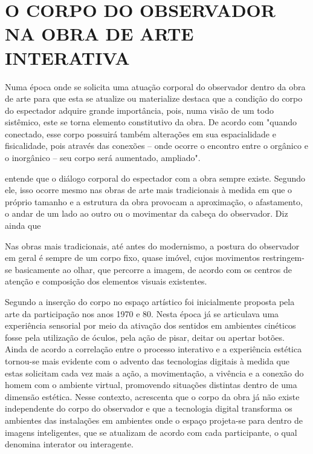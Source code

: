 \section{O CORPO DO OBSERVADOR NA OBRA DE ARTE INTERATIVA}
	
Numa época onde se solicita uma atuação corporal do observador dentro da obra de arte para que esta se atualize ou materialize  destaca que a condição do corpo do espectador adquire grande importância, pois, numa visão de um todo sistêmico, este se torna elemento constitutivo da obra. De acordo com  "quando conectado, esse corpo possuirá também alterações em sua espacialidade e fisicalidade, pois através das conexões – onde ocorre o encontro entre o orgânico e o inorgânico – seu corpo será aumentado, ampliado".
	
 entende que o diálogo corporal do espectador com a obra sempre existe. Segundo ele, isso ocorre mesmo nas obras de arte mais tradicionais à medida em que o próprio tamanho e a estrutura da obra provocam a aproximação, o afastamento, o andar de um lado ao outro ou o movimentar da cabeça do observador. Diz ainda que

\begin{citacao}
Nas obras mais tradicionais, até antes do modernismo, a postura do observador em geral é sempre de um corpo fixo, quase imóvel, cujos movimentos restringem-se basicamente ao olhar, que percorre a imagem, de acordo com os centros de atenção e composição dos elementos visuais existentes. \cite{sogabe} 
\end{citacao}

Segundo  a inserção do corpo no espaço artístico foi inicialmente proposta pela arte da participação nos anos 1970 e 80. Nesta época já se articulava uma experiência sensorial por meio da ativação dos sentidos em ambientes cinéticos fosse pela utilização de óculos, pela ação de pisar, deitar ou apertar botões. Ainda de acordo  a correlação entre o processo interativo e a experiência estética tornou-se mais evidente com o advento das tecnologias digitais à medida que estas solicitam cada vez mais a ação, a movimentação, a vivência e a conexão do homem com o ambiente virtual, promovendo situações distintas dentro de uma dimensão estética. Nesse contexto,  acrescenta que o corpo da obra já não existe independente do corpo do observador e que a tecnologia digital transforma os ambientes das instalações em ambientes onde o espaço projeta-se para dentro de imagens inteligentes, que se atualizam de acordo com cada participante, o qual denomina interator ou interagente.

